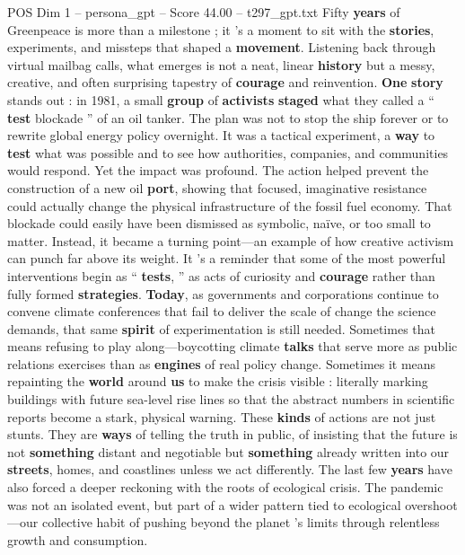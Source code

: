 \begin{textsample}{POS Dim 1 – persona\_gpt – Score 44.00 – t297\_gpt.txt}  \label{ex:f1_pos_025}
Fifty \textbf{years} of Greenpeace is more than a milestone ; it ’s a moment to sit with the \textbf{stories}, experiments, and missteps that shaped a \textbf{movement}.
Listening back through virtual mailbag calls, what emerges is not a neat, linear \textbf{history} but a messy, creative, and often surprising tapestry of \textbf{courage} and reinvention. \textbf{One} \textbf{story} stands out : in 1981, a small \textbf{group} of \textbf{activists} \textbf{staged} what they called a “ \textbf{test} blockade ” of an oil tanker.
The plan was not to stop the ship forever or to rewrite global energy policy overnight.
It was a tactical experiment, a \textbf{way} to \textbf{test} what was possible and to see how authorities, companies, and communities would respond.
Yet the impact was profound.
The action helped prevent the construction of a new oil \textbf{port}, showing that focused, imaginative resistance could actually change the physical infrastructure of the fossil fuel economy.
That blockade could easily have been dismissed as symbolic, naïve, or too small to matter.
Instead, it became a turning point—an example of how creative activism can punch far above its weight.
It ’s a reminder that some of the most powerful interventions begin as “ \textbf{tests}, ” as acts of curiosity and \textbf{courage} rather than fully formed \textbf{strategies}. \textbf{Today}, as governments and corporations continue to convene climate conferences that fail to deliver the scale of change the science demands, that same \textbf{spirit} of experimentation is still needed.
Sometimes that means refusing to play along—boycotting climate \textbf{talks} that serve more as public relations exercises than as \textbf{engines} of real policy change.
Sometimes it means repainting the \textbf{world} around \textbf{us} to make the crisis visible : literally marking buildings with future sea-level rise lines so that the abstract numbers in scientific reports become a stark, physical warning.
These \textbf{kinds} of actions are not just stunts.
They are \textbf{ways} of telling the truth in public, of insisting that the future is not \textbf{something} distant and negotiable but \textbf{something} already written into our \textbf{streets}, homes, and coastlines unless we act differently.
The last few \textbf{years} have also forced a deeper reckoning with the roots of ecological crisis.
The pandemic was not an isolated event, but part of a wider pattern tied to ecological overshoot—our collective habit of pushing beyond the planet ’s limits through relentless growth and consumption.

\end{textsample}
